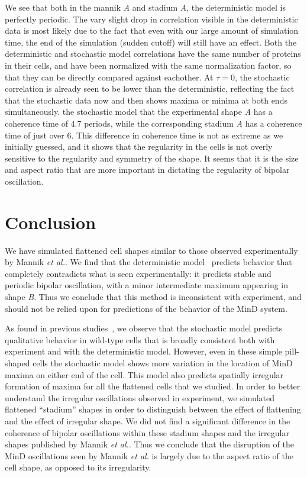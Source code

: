 \documentclass[letterpaper,twocolumn,amsmath,amssymb,pre]{revtex4-1}
\begin{document}
We see that both in the mannik \emph{A} and stadium \emph{A}, the
deterministic model is perfectly periodic.  The vary slight drop in
correlation visible in the deterministic data is most likely due to
the fact that even with our large amount of simulation time, the end
of the simulation (sudden cutoff) will still have an effect. Both the
deterministic and stochastic model correlations have the same number
of proteins in their cells, and have been normalized with the same
normalization factor, so that they can be directly compared against
eachother.  At $\tau=0$, the stochastic correlation is already seen to
be lower than the deterministic, reflecting the fact that the
stochastic data now and then shows maxima or minima at both ends
simultaneously.  the stochastic model that the experimental shape
\emph{A} has a coherence time of 4.7 periods, while the corresponding
stadium \emph{A} has a coherence time of just over 6. This difference
in coherence time is not as extreme as we initially guessed, and it
shows that the regularity in the cells is not overly sensitive to the
regularity and symmetry of the shape.  It seems that it is the size
and aspect ratio that are more important in dictating the regularity
of bipolar oscillation.

\section{Conclusion}
We have simulated flattened cell shapes similar to those observed
experimentally by Mannik \emph{et al.}.  We find that the
deterministic model~\cite{huang2003dynamic} predicts behavior that
completely contradicts what is seen experimentally: it predicts stable
and periodic bipolar oscillation, with a minor intermediate maximum
appearing in shape \emph{B}.  Thus we conclude that this method is
inconsistent with experiment, and should not be relied upon for
predictions of the behavior of the MinD system.

As found in previous studies~\cite{fange2006noise, varma2008min,
  kruse2007experimentalist}, we observe that the stochastic model
predicts qualitative behavior in wild-type cells that is broadly
consistent both with experiment and with the deterministic
model. However, even in these simple pill-shaped cells the stochastic
model shows more variation in the location of MinD maxima on either
end of the cell. This model also predicts spatially irregular
formation of maxima for all the flattened cells that we studied.  In
order to better understand the irregular oscillations observed in
experiment, we simulated flattened ``stadium'' shapes in order to
distinguish between the effect of flattening and the effect of
irregular shape.  We did not find a significant difference in the
coherence of bipolar oscillations within these stadium shapes and the
irregular shapes published by Mannik \emph{et al.}.  Thus we conclude
that the disruption of the MinD oscillations seen by Mannik \emph{et
  al.}  is largely due to the aspect ratio of the cell shape, as
opposed to its irregularity.
\end{document}
